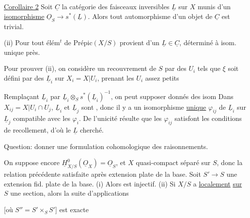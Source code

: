 \uline{Corollaire 2} Soit $\underline C$ la catégorie des faisceaux inversibles $\underline L$ sur $X$ munis d'un \uline{isomorphisme} $\underline O_S\to s^*(\underline L)$. Alors  tout automorphisme d'un objet de $\underline C$ est trivial.

(ii) Pour  tout élém$^t$ de $\mathrm{Prépic}(X/S)$ provient d'un $\underline L\in\underline C$, déterminé à isom. unique près.

Pour prouver (ii), on considère un recouvrement de $S$ par des $U_i$ tels que $\xi$ soit défini par des $\underline L_i$ sur $X_i=X|U_i$, prenant les $U_i$ assez petits


Remplaçant $\underline L_i$ par $\underline L_i\otimes_S s^*(\underline L_i)^{-1}$, on peut supposer donnés des isom
Dans $X_{ij}=X|U_i\cap U_j$, $\underline L_i$ et $\underline L_j$ sont , donc il y a un isomorphisme \uline{unique} $\varphi_{ij}$ de $\underline L_i$ sur $\underline L_j$ compatible avec les $\varphi_i$. De l'unicité résulte que les $\varphi_{ij}$ satisfont les conditions de recollement, d'où le $\underline L$ cherché.

Question: donner une formulation cohomologique des raisonnements.

 On suppose encore $\underline H^0_{X/S}(\underline O_X)=\underline O_S$, et $X$ quasi-compact séparé sur $S$, donc la relation précédente satisfaite après extension plate de la base. Soit $S'\to S$ une extension fid. plate  de la base. (i) Alors
est injectif. (ii) Si $X/S$ a \uline{localement} \uline{sur $S$} une section, alors la suite d'applications

[où $S''=S'\times_S S'$] est exacte 

